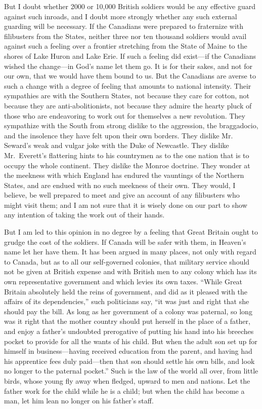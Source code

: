 But I doubt whether 2000 or 10,000 British soldiers would be any
effective guard against such inroads, and I doubt more strongly
whether any such external guarding will be necessary.  If the
Canadians were prepared to fraternize with filibusters from the
States, neither three nor ten thousand soldiers would avail against
such a feeling over a frontier stretching from the State of Maine
to the shores of Lake Huron and Lake Erie.  If such a feeling did
exist---if the Canadians wished the change---in God's name let them
go.  It is for their sakes, and not for our own, that we would have
them bound to us.  But the Canadians are averse to such a change
with a degree of feeling that amounts to national intensity.  Their
sympathies are with the Southern States, not because they care for
cotton, not because they are anti-abolitionists, not because they
admire the hearty pluck of those who are endeavoring to work out
for themselves a new revolution.  They sympathize with the South
from strong dislike to the aggression, the braggadocio, and the
insolence they have felt upon their own borders.  They dislike Mr.\ %
Seward's weak and vulgar joke with the Duke of Newcastle.  They
dislike Mr.\ Everett's flattering hints to his countrymen as to the
one nation that is to occupy the whole continent.  They dislike the
Monroe doctrine.  They wonder at the meekness with which England
has endured the vauntings of the Northern States, and are endued
with no such meekness of their own.  They would, I believe, be well
prepared to meet and give an account of any filibusters who might
visit them; and I am not sure that it is wisely done on our part to
show any intention of taking the work out of their hands.

But I am led to this opinion in no degree by a feeling that Great
Britain ought to grudge the cost of the soldiers.  If Canada will
be safer with them, in Heaven's name let her have them.  It has
been argued in many places, not only with regard to Canada, but as
to all our self-governed colonies, that military service should not
be given at British expense and with British men to any colony
which has its own representative government and which levies its
own taxes.  ``While Great Britain absolutely held the reins of
government, and did as it pleased with the affairs of its
dependencies,'' such politicians say, ``it was just and right that
she should pay the bill.  As long as her government of a colony was
paternal, so long was it right that the mother country should put
herself in the place of a father, and enjoy a father's undoubted
prerogative of putting his hand into his breeches pocket to provide
for all the wants of his child.  But when the adult son set up for
himself in business---having received education from the parent, and
having had his apprentice fees duly paid---then that son should
settle his own bills, and look no longer to the paternal pocket.''
Such is the law of the world all over, from little birds, whose
young fly away when fledged, upward to men and nations.  Let the
father work for the child while he is a child; but when the child
has become a man, let him lean no longer on his father's staff.

